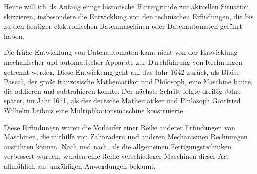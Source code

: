 {Heute will ich als Anfang einige historische Hintergründe zur aktuellen Situation skizzieren, insbesondere die Entwicklung von den technischen Erfindungen, die bis zu den heutigen elektronischen Datenmaschinen oder Datenautomaten geführt haben.
}


{
Die frühe Entwicklung von Datenautomaten kann nicht von der Entwicklung mechanischer und automatischer Apparate zur Durchführung von Rechnungen getrennt werden. Diese Entwicklung geht auf das Jahr 1642 zurück, als Blaise Pascal, der große französische Mathematiker und Philosoph, eine Maschine baute, die addieren und subtrahieren konnte. Der nächste Schritt folgte dreißig Jahre später, im Jahr 1671, als der deutsche Mathematiker und Philosoph Gottfried Wilhelm Leibniz eine Multiplikationsmaschine konstruierte.

Diese Erfindungen waren die Vorläufer einer Reihe anderer Erfindungen von Maschinen, die mithilfe von Zahnrädern und anderen Mechanismen Rechnungen ausführen können. Nach und nach, als die allgemeinen Fertigungstechniken verbessert wurden, wurden eine Reihe verschiedener Maschinen dieser Art allmählich aus unzähligen Anwendungen bekannt.
}



